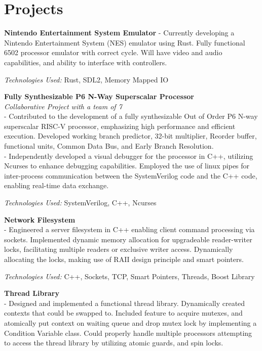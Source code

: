 \documentclass[9pt]{extarticle}
\begin{document}
\section*{Projects}
\noindent \textbf{Nintendo Entertainment System Emulator}
- Currently developing a Nintendo Entertainment System (NES) emulator using Rust.
Fully functional 6502 processor emulator with correct cycle. Will have video and audio capabilities, and ability to interface with controllers.

\textit{Technologies Used:} Rust, SDL2, Memory Mapped IO

\noindent \textbf{Fully Synthesizable P6 N-Way Superscalar Processor} \\
\textit{Collaborative Project with a team of 7} \\
- Contributed to the development of a fully synthesizable Out of Order P6 N-way superscalar RISC-V processor, emphasizing high performance and efficient execution.
Developed working branch predictor, 32-bit multiplier, Reorder buffer, functional units, Common Data Bus, and Early Branch Resolution.  \\
- Independently developed a visual debugger for the processor in C++,
utilizing Ncurses to enhance debugging capabilities.
Employed the use of linux pipes for inter-process communication between the SystemVerilog code
and the C++ code, enabling real-time data exchange.

\textit{Technologies Used:} SystemVerilog, C++, Ncurses

\noindent \textbf{Network Filesystem} \\
- Engineered a server filesystem in C++ enabling client command processing via sockets.
Implemented dynamic memory allocation for upgradeable reader-writer locks,
facilitating multiple readers or exclusive writer access. Dynamically allocating the locks, making use of RAII design principle and smart pointers.

\textit{Technologies Used:} C++, Sockets, TCP, Smart Pointers, Threads, Boost Library

\noindent \textbf{Thread Library} \\
- Designed and implemented a functional thread library. Dynamically created contexts that could be swapped to.
Included feature to acquire mutexes, and atomically put context on waiting queue and drop mutex lock by implementing a Condition Variable class.
Could properly handle multiple processors attempting to access the thread library by utilizing atomic guards, and spin locks.
\end{document}
